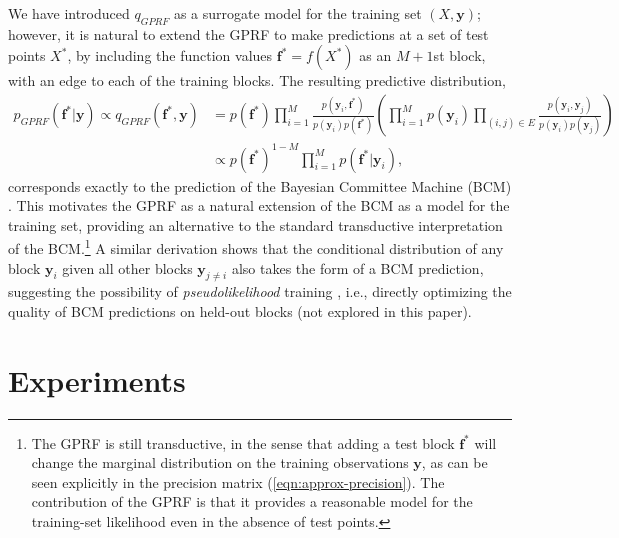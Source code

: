 \documentclass{article}
\renewcommand{\v}[1]{\mathbf{#1}}
\begin{document}
We have introduced $q_{GPRF}$ as a surrogate model
for the training set $(X, \v{y})$; however, it is natural to extend
the GPRF to make predictions at a set of test points $X^*$, by including the
function values $\v{f}^* = f(X^*)$ as an $M+1$st block, with an edge to each of the training blocks. The resulting
predictive distribution,
\begin{align}
p_{GPRF}(\v{f}^* | \v{y}) \propto q_{GPRF}(\v{f}^*, \v{y}) 
&= p(\v{f}^*) \prod_{i=1}^M \frac{p(\v{y}_i,
  \v{f}^*)}{p(\v{y}_i) p(\v{f}^*)} \left(\prod_{i=1}^M p(\v{y}_i) \prod_{(i,j)\in E} \frac{p(\v{y}_i, \v{y}_j)}{p(\v{y}_i)
    p(\v{y}_j)}\right)  \nonumber \\
&\propto p(\v{f}^*)^{1-M} \prod_{i=1}^M p(\v{f}^* | \v{y}_i),
\end{align}
corresponds exactly to the prediction of 
the Bayesian Committee Machine (BCM) \citep{tresp2000bayesian}. This motivates the
GPRF as a natural extension of the BCM as a model for the training
set, providing an alternative to the standard transductive
interpretation of the BCM.\footnote{The GPRF is still transductive, in
  the sense that adding a test block $\v{f^*}$ will change the
  marginal distribution on the training observations $\v{y}$, as 
  can be seen explicitly in the precision matrix (\ref{eqn:approx-precision}). The contribution of the GPRF is that it provides a reasonable model for
  the training-set likelihood even in the absence of test
  points. } A similar derivation shows that the conditional distribution of any
block $\v{y}_i$ given all other blocks $\v{y}_{j\ne i}$ also takes the
form of a BCM prediction, suggesting the possibility of
{\em pseudolikelihood} training \cite{besag1975statistical}, i.e.,
directly optimizing the quality of BCM predictions on held-out blocks
(not explored in this paper).


\section{Experiments}
\vspace{-0.2cm}
\end{document}
